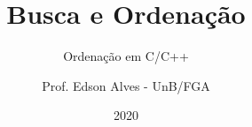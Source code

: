 \title{Busca e Ordenação}
\subtitle{Ordenação em C/C++}
\author{Prof. Edson Alves - UnB/FGA}
\date{2020}
